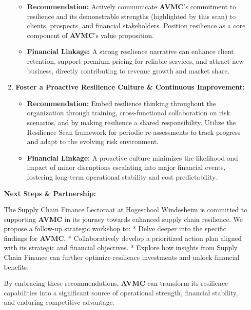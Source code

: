 \documentclass[
  oneside,
  open=any,
  fontsize=11pt]{scrbook}
\providecommand{\tightlist}{%
  \setlength{\itemsep}{0pt}\setlength{\parskip}{0pt}}
\begin{document}
\begin{enumerate}
  \begin{itemize}
  \tightlist
  \item
    \textbf{Recommendation:} Actively communicate \textbf{AVMC}'s
    commitment to resilience and its demonstrable strengths (highlighted
    by this scan) to clients, prospects, and financial stakeholders.
    Position resilience as a core component of \textbf{AVMC}'s value
    proposition.
  \item
    \textbf{Financial Linkage:} A strong resilience narrative can
    enhance client retention, support premium pricing for reliable
    services, and attract new business, directly contributing to revenue
    growth and market share.
  \end{itemize}
\item
  \textbf{Foster a Proactive Resilience Culture \& Continuous
  Improvement:}

  \begin{itemize}
  \tightlist
  \item
    \textbf{Recommendation:} Embed resilience thinking throughout the
    organization through training, cross-functional collaboration on
    risk scenarios, and by making resilience a shared responsibility.
    Utilize the Resilience Scan framework for periodic re-assessments to
    track progress and adapt to the evolving risk environment.
  \item
    \textbf{Financial Linkage:} A proactive culture minimizes the
    likelihood and impact of minor disruptions escalating into major
    financial events, fostering long-term operational stability and cost
    predictability.
  \end{itemize}
\end{enumerate}

\textbf{Next Steps \& Partnership:}

The Supply Chain Finance Lectoraat at Hogeschool Windesheim is committed
to supporting \textbf{AVMC} in its journey towards enhanced supply chain
resilience. We propose a follow-up strategic workshop to: * Delve deeper
into the specific findings for \textbf{AVMC}. * Collaboratively develop
a prioritized action plan aligned with its strategic and financial
objectives. * Explore how insights from Supply Chain Finance can further
optimize resilience investments and unlock financial benefits.

By embracing these recommendations, \textbf{AVMC} can transform its
resilience capabilities into a significant source of operational
strength, financial stability, and enduring competitive advantage.
\end{document}

